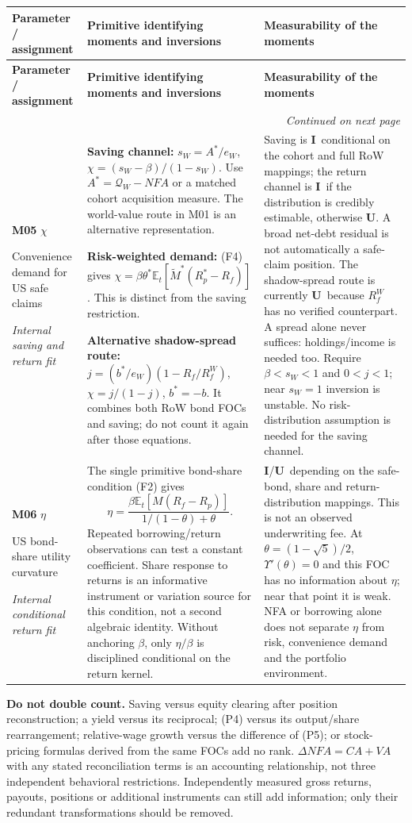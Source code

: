 \documentclass[10pt,a4paper,landscape]{article}
\makeatletter
\newcommand{\E}{\mathbb E_t}
\newcommand{\Q}{\mathcal Q}\newcommand{\I}{\mathcal I}\newcommand{\D}{\mathcal D}
\newcommand{\indirect}{\textbf{I}}
\newcommand{\unavail}{\textbf{U}}
\newcommand{\route}[1]{\par\textit{#1}}
\newenvironment{momenttable}{%
\fontsize{9.5}{11.2}\selectfont\setlength{\parskip}{3pt}
\begin{longtable}{@{}P{\dimexpr .16\textwidth-6.67pt\relax}P{\dimexpr .49\textwidth-6.67pt\relax}P{\dimexpr .35\textwidth-6.66pt\relax}@{}}
\toprule\rowcolor{tablehead}\textbf{Parameter / assignment} & \textbf{Primitive identifying moments and inversions} & \textbf{Measurability of the moments}\\\midrule
\endfirsthead
\toprule\rowcolor{tablehead}\textbf{Parameter / assignment} & \textbf{Primitive identifying moments and inversions} & \textbf{Measurability of the moments}\\\midrule
\endhead
\midrule\multicolumn{3}{r}{\footnotesize\itshape Continued on next page}\\\endfoot
\bottomrule\endlastfoot
}{\end{longtable}}
\makeatother
\begin{document}
\begin{momenttable}
\textbf{M05} $\chi$\par Convenience demand for US safe claims\route{Internal saving and return fit}
& \textbf{Saving channel:}
\(s_W=A^*/e_W\),
\(\chi=(s_W-\beta)/(1-s_W)\).
Use $A^*=\Q_W-NFA$ or a matched cohort acquisition measure. The world-value route in M01 is an alternative representation.\par
\textbf{Risk-weighted demand:} (F4) gives
\(\chi=\beta\theta^*\E[\widetilde M^*(R_p^*-R_f)]\).
This is distinct from the saving restriction.\par
\textbf{Alternative shadow-spread route:}
\(j=(b^*/e_W)(1-R_f/R_f^W)\),
\(\chi=j/(1-j)\), $b^*=-b$.
It combines both RoW bond FOCs and saving; do not count it again after those equations.
& Saving is \indirect\ conditional on the cohort and full RoW mappings; the return channel is \indirect\ if the distribution is credibly estimable, otherwise \unavail. A broad net-debt residual is not automatically a safe-claim position. The shadow-spread route is currently \unavail\ because $R_f^W$ has no verified counterpart. A spread alone never suffices: holdings/income is needed too. Require $\beta<s_W<1$ and $0<j<1$; near $s_W=1$ inversion is unstable. No risk-distribution assumption is needed for the saving channel.\\[5pt]
\textbf{M06} $\eta$\par US bond-share utility curvature\route{Internal conditional return fit}
& The single primitive bond-share condition (F2) gives
\[
 \eta=\frac{\beta\E[M(R_f-R_p)]}{1/(1-\theta)+\theta}.
\]
Repeated borrowing/return observations can test a constant coefficient. Share response to returns is an informative instrument or variation source for this condition, not a second algebraic identity. Without anchoring $\beta$, only $\eta/\beta$ is disciplined conditional on the return kernel.
& \indirect/\unavail\ depending on the safe-bond, share and return-distribution mappings. This is not an observed underwriting fee. At $\theta=(1-\sqrt5)/2$, $\Upsilon'(\theta)=0$ and this FOC has no information about $\eta$; near that point it is weak. NFA or borrowing alone does not separate $\eta$ from risk, convenience demand and the portfolio environment.\\[3pt]
\end{momenttable}
\textbf{Do not double count.} Saving versus equity clearing after position reconstruction; a yield versus its reciprocal; (P4) versus its output/share rearrangement; relative-wage growth versus the difference of (P5); or stock-pricing formulas derived from the same FOCs add no rank. $\Delta NFA=CA+VA$ with any stated reconciliation terms is an accounting relationship, not three independent behavioral restrictions. Independently measured gross returns, payouts, positions or additional instruments can still add information; only their redundant transformations should be removed.
\end{document}
